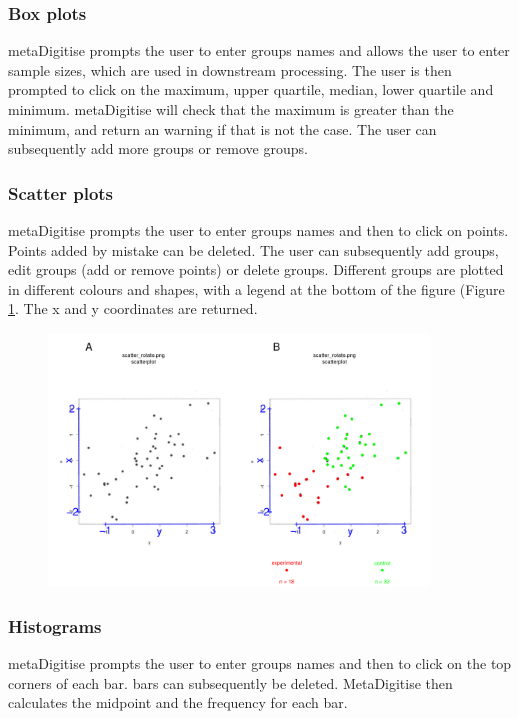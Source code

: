 \documentclass{article}
\begin{document}
\subsubsection{Box plots}
 metaDigitise prompts the user to enter groups names and allows the user to enter sample sizes, which are used in downstream processing. The user is then prompted to click on the maximum, upper quartile, median, lower quartile and minimum. metaDigitise will check that the maximum is greater than the minimum, and return an warning if that is not the case. The user can subsequently add more groups or remove groups.

\subsubsection{Scatter plots}
 metaDigitise prompts the user to enter groups names and then to click on points. Points added by mistake can be deleted. The user can subsequently add groups, edit groups (add or remove points) or delete groups. Different groups are plotted in different colours and shapes, with a legend at the bottom of the figure (Figure \ref{fig:scatter_points}. The x and y coordinates are returned.

\begin{figure}[!h] 
 \includegraphics[width=0.9\textwidth]{fig_scatter_points.pdf} 
 \caption{ }
\label{fig:scatter_points}
\end{figure}


\subsubsection{Histograms}
metaDigitise prompts the user to enter groups names and then to click on the top corners of each bar. bars can subsequently be deleted. MetaDigitise then calculates the midpoint and the frequency for each bar. 
\end{document}
